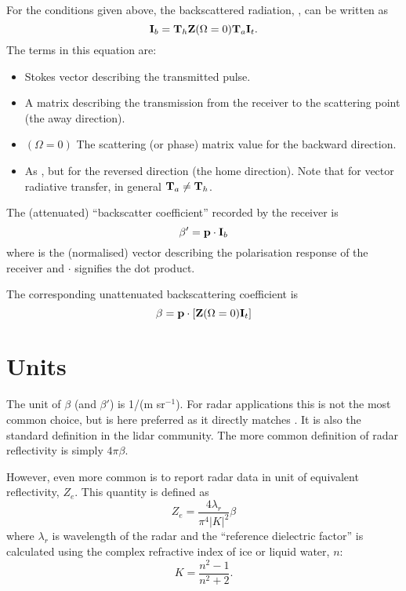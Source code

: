 For the conditions given above, the backscattered radiation, , can be
written as
\begin{equation}
  \label{eq:cradar:bscatt1}
  {\bf I}_{b} = {\bf T}_{h}{\bf Z}(\Omega=0){\bf T}_{a}{\bf I}_{t}.
\end{equation}
The terms in this equation are:
\begin{itemize}
\item[\aStoVec{t}] Stokes vector describing the transmitted pulse.
\item[\aTraMat{a}] A matrix describing the transmission from the receiver to
  the scattering point (the away direction). 
\item[\PhaMat]$\!\!\!(\Omega=0)$ The scattering (or phase) matrix value for the
  backward direction. 
\item[\aTraMat{h}] As , but for the reversed direction (the home
  direction). Note that for vector radiative transfer, in general
  ${\bf T}_{a}\neq{\bf T}_{h}$.
\end{itemize}
The (attenuated) ``backscatter coefficient'' recorded by the receiver is
\begin{equation}
  \label{eq:cradar:bscatt2}
  \beta' = \mathbf{p} \cdot {\bf I}_{b} 
\end{equation}
where  is the (normalised) vector describing the polarisation
response of the receiver and $\cdot$ signifies the dot product.

The corresponding unattenuated backscattering coefficient is
\begin{equation}
  \label{eq:cradar:bscatt3}
  \beta = \mathbf{p} \cdot \left[{\bf Z}(\Omega=0){\bf I}_{t}\right]
\end{equation}


\section{Units}
\label{sec:cradar:units}

The unit of $\beta$ (and $\beta'$) is 1/(m sr$^{-1}$). For radar applications
this is not the most common choice, but is here preferred as it directly
matches \PhaMat. It is also the standard definition in the lidar community. The
more common definition of radar reflectivity is simply $4\pi\beta$.

However, even more common is to report radar data in unit of equivalent
reflectivity, $Z_e$. This quantity is defined as \citep[e.g.][]{donovan:01}
\begin{equation}
  \label{eq:cradar:ze}
  Z_e = \frac{4\lambda_r}{\pi^4|K|^2}\beta
\end{equation}
where $\lambda_r$ is wavelength of the radar and the ``reference dielectric
factor'' is calculated using the complex refractive index of ice or liquid
water, $n$:
\begin{equation}
  K = \frac{n^2-1}{n^2+2}.
\end{equation}



